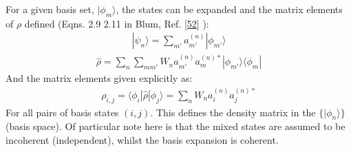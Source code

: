 \documentclass[letterpaper,table,10pt,english]{jupyterBook}
\begin{document}
\sphinxAtStartPar
For a given basis set, \(|\phi_{m}\rangle\), the states can be expanded and the matrix elements of \(\rho\) defined (Eqns. 2.9 \sphinxhyphen{} 2.11 in Blum, Ref. {[}\hyperlink{cite.backmatter/bibliography:id444}{52}{]} \sphinxfootnotemark[1]):
\begin{equation*}
\begin{split}
| \psi_{n} \rangle = \sum_{m'} a_{m'}^{(n)}| \phi_{m'}\rangle
\end{split}
\end{equation*}\begin{equation}\label{equation:part1/theory_density_matrices_310123:eqn:density-mat-outer-prod}
\begin{split}
\hat{\rho}=\sum_{n}\sum_{mm'}W_{n}a_{m'}^{(n)}a_{m}^{(n)*}|\phi_{m'}\rangle\langle\phi_{m}|
\end{split}
\end{equation}
\sphinxAtStartPar
And the matrix elements \sphinxhyphen{}  \sphinxhyphen{} given explicitly as:
\begin{equation}\label{equation:part1/theory_density_matrices_310123:eqn:density-mat-generic}
\begin{split}
\rho_{i,j}=\langle\phi_{i}|\hat{\rho}|\phi_{j}\rangle=\sum_{n}W_{n}a_{i}^{(n)}a_{j}^{(n)*}
\end{split}
\end{equation}
\sphinxAtStartPar
For all pairs of basis states \((i,j)\). This defines the density matrix in the \(\{|\phi_n\rangle\}\)  (basis space). Of particular note here is that the mixed states are assumed to be incoherent (independent), whilst the basis expansion is coherent.
\end{document}
